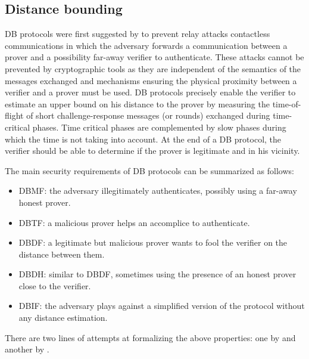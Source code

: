 \subsection{Distance bounding}%
\label{DistanceBounding}

\Ac{DB} protocols were first suggested by \citet{DistanceBounding} to prevent relay attacks contactless communications in which the adversary forwards a communication between a prover and a possibility far-away verifier to authenticate. 
These attacks cannot be prevented by cryptographic tools as they are independent of the semantics of the messages exchanged and mechanisms ensuring the physical proximity between a verifier and a prover must be used.
\Ac{DB} protocols precisely enable the verifier to estimate an upper bound on his distance to the prover by measuring the time-of-flight of short challenge-response messages (or rounds) exchanged during time-critical phases. 
Time critical phases are complemented by slow phases during which the time is not taking into account.
At the end of a \Ac{DB} protocol, the verifier should be able to determine if the prover is legitimate and in his vicinity.

The main security requirements of \ac{DB} protocols can be summarized as follows:
\begin{itemize}
  \item \ac{DBMF}: the adversary illegitimately authenticates, possibly using a far-away honest prover.
  \item\ac{DBTF}: a malicious prover helps an accomplice to authenticate.
    \item \ac{DBDF}: a legitimate but malicious prover wants to fool the verifier on the distance between them.
  \item \ac{DBDH}: similar to \ac{DBDF}, sometimes using the presence of an honest prover close to the verifier.
  \item \ac{DBIF}: the adversary plays against a simplified version of the protocol without any distance estimation.
\end{itemize}
There are two lines of attempts at formalizing the above properties: one by \citet{DB-BMV} and another by \citet{DB-DFKO}.

